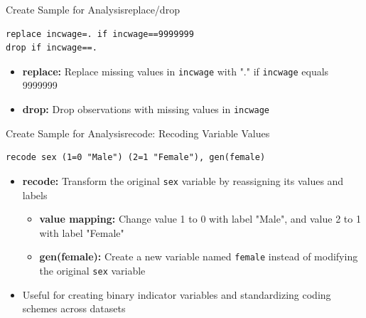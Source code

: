 \documentclass[dvipsnames,hyperref={pdfpagelabels=false}]{beamer}
\begin{document}
\begin{frame}[fragile]{Create Sample for Analysis}{replace/drop}
\begin{lstlisting}
replace incwage=. if incwage==9999999
drop if incwage==.
\end{lstlisting}
		\vspace{0.2cm}
	\begin{itemize}
		\item \textbf{replace:} Replace missing values in \texttt{incwage} with "." if \texttt{incwage} equals 9999999  
		\vspace{0.2cm}
		\item \textbf{drop:} Drop observations with missing values in \texttt{incwage}
		
		
	\end{itemize}
\end{frame}




\begin{frame}[fragile]{Create Sample for Analysis}{recode: Recoding Variable Values}
	
		
\begin{lstlisting}
recode sex (1=0 "Male") (2=1 "Female"), gen(female)
\end{lstlisting}
		
		\vspace{0.2cm}
		
\begin{itemize}
		\item \textbf{recode:} Transform the original \texttt{sex} variable by reassigning its values and labels
		
		\vspace{0.2cm}
		\begin{itemize}
		
		\item \textbf{value mapping:} Change value 1 to 0 with label "Male", and value 2 to 1 with label "Female"
		
		\vspace{0.2cm}
		
		\item \textbf{gen(female):} Create a new variable named \texttt{female} instead of modifying the original \texttt{sex} variable
		
		\vspace{0.2cm}
					\end{itemize}
		\item Useful for creating binary indicator variables and standardizing coding schemes across datasets

	\end{itemize}
	
\end{frame}
\end{document}
